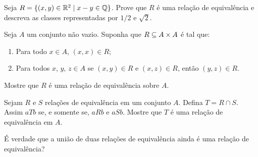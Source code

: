 \documentclass[12pt]{exam}
\begin{document}
    \vspace{.3cm}

    \questao{} Seja $R = \{ (x, y) \in \mathbb{R}^2 \mid x - y \in \mathbb{Q}\}$. Prove que $R$ é uma relação de equivalência e descreva as classes representadas por $1/2$ e $\sqrt{2}$.

    \vspace{.3cm}

    \questao{} Seja $A$ um conjunto não vazio. Suponha que $R \subseteq A \times A$ é tal que:
    \begin{enumerate}[label={\alph*})]
        \item Para todo $x \in A$, $(x,x) \in R$;

        \item Para todos $x$, $y$, $z \in A$ se $(x, y) \in R$ e $(x,z) \in R$, então $(y,z) \in R$.
    \end{enumerate}
    Mostre que $R$ é uma relação de equivalência sobre $A$.

    \vspace{.3cm}

    \questao{} Sejam $R$ e $S$ relações de equivalência em um conjunto $A$. Defina $T = R \cap S$. Assim $aTb$ se, e somente se, $aRb$ e $aSb$. Mostre que $T$ é uma relação de equivalência em $A$.

    \vspace{.3cm}

    \questao{} É verdade que a união de duas relações de equivalência ainda é uma relação de equivalência?
\end{document}
